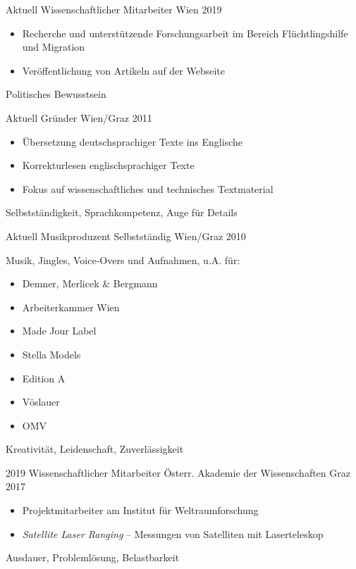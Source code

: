 %
%


\begin{experiences}
	\experience
	{Aktuell}
	{Wissenschaftlicher Mitarbeiter}
	{}
	{Wien}
	{2019}
	{
		\begin{itemize}
			\item Recherche und unterstützende Forschungsarbeit im Bereich
			      Flüchtlingshilfe und Migration
			\item Veröffentlichung von Artikeln auf der Webseite
		\end{itemize}
	}
	{Politisches Bewusstsein}

	\emptySeparator

	\experience
	{Aktuell}
	{Gründer}
	{}
	{Wien/Graz}
	{2011}
	{
		\begin{itemize}
			\item Übersetzung deutschsprachiger Texte ins Englische
			\item Korrekturlesen englischsprachiger Texte
			\item Fokus auf wissenschaftliches und technisches Textmaterial
		\end{itemize}
	}
	{Selbstständigkeit, Sprachkompetenz, Auge für Details}

	\emptySeparator

	\experience
	{Aktuell}
	{Musikproduzent}
	{Selbstständig}
	{Wien/Graz}
	{2010}
	{
		Musik, Jingles, Voice-Overs und Aufnahmen, u.A. für:
		\begin{itemize}
			\item Demner, Merlicek \& Bergmann
			\item Arbeiterkammer Wien
			\item Made Jour Label
			\item Stella Models
			\item Edition A
			\item Vöslauer
			\item OMV
		\end{itemize}
	}
	{Kreativität, Leidenschaft, Zuverlässigkeit}

	\emptySeparator

	\experience
	{2019}
	{Wissenschaftlicher Mitarbeiter}
	{Österr. Akademie der Wissenschaften}
	{Graz}
	{2017}
	{
		\begin{itemize}
			\item Projektmitarbeiter am Institut für Weltraumforschung
			\item \textit{Satellite Laser Ranging} –
			      Messungen von Satelliten mit Laserteleskop
		\end{itemize}
	}
	{Ausdauer, Problemlösung, Belastbarkeit}


\end{experiences}
